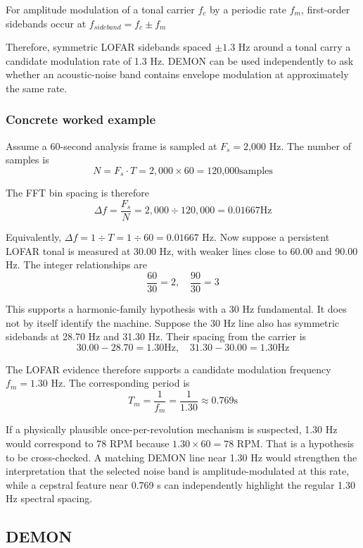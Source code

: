 For amplitude modulation of a tonal carrier $f_c $ by a periodic rate $f_m$, first-order sidebands occur at $f_{sideband} = f_c \pm f_m$

Therefore, symmetric LOFAR sidebands spaced $\pm 1.3$ Hz around a tonal carry a candidate modulation rate of 1.3 Hz. DEMON can be used independently to ask whether an acoustic-noise band contains envelope modulation at approximately the same rate.

\subsubsection{Concrete worked example}

Assume a 60-second analysis frame is sampled at $F_s = \text{2,000}$ Hz. The number of samples is
\[
N = F_s \cdot T = 2,000 \times 60 = \text{120,000} \text{samples}
\]

The FFT bin spacing is therefore
\[
    \Delta f = \frac{F_s}{N} = 2,000 \div 120,000 = 0.01667 \text{Hz}
\]

Equivalently, $\Delta f = 1 \div T = 1 \div 60 = 0.01667$ Hz. Now suppose a persistent LOFAR tonal is measured at 30.00 Hz, with weaker lines close to 60.00 and 90.00 Hz. The integer relationships are
\[
    \frac{60}{30} = 2, \quad \frac{90}{30} = 3
\]

This supports a harmonic-family hypothesis with a 30 Hz fundamental. It does not by itself identify the machine. Suppose the 30 Hz line also has symmetric sidebands at 28.70 Hz and 31.30 Hz. Their spacing from the carrier is
\[
    30.00 - 28.70 = 1.30 \text{Hz},  \quad   31.30 - 30.00 = 1.30 \text{Hz}
\]

The LOFAR evidence therefore supports a candidate modulation frequency $f_m = 1.30$ Hz. The corresponding period is
\[
    T_m = \frac{1}{f_m} = \frac{1}{1.30} \approx 0.769 \text{s}
\]

If a physically plausible once-per-revolution mechanism is suspected, 1.30 Hz would correspond to 78 RPM because $1.30 \times 60 = 78$ RPM. That is a hypothesis to be cross-checked. A matching DEMON line near 1.30 Hz would strengthen the interpretation that the selected noise band is amplitude-modulated at this rate, while a cepstral feature near 0.769 s can independently highlight the regular 1.30 Hz spectral spacing.


\subsection{DEMON}

